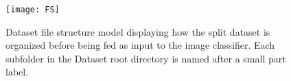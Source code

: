 \begin{figure}[h]
\centering
  \texttt{[image: FS]}
\caption{Dataset file structure model displaying how the split dataset is organized before being fed as input to the image classifier. Each subfolder in the Dataset root directory is named after a small part label.}
\label{fig:FS}
\end{figure}
